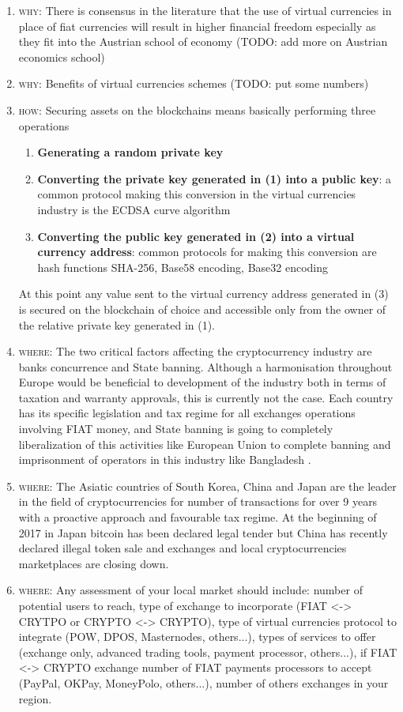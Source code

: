 \documentclass[11pt,fleqn,oneside]{book} %
\begin{document}
\begin{enumerate}
	\item \textsc{why}: There is consensus in the literature that the use of virtual currencies in place of fiat currencies will result in 
	higher financial freedom especially as they fit into the Austrian school of economy \cite{austrianTheory} 
	(TODO: add more on Austrian economics school)

	\item \textsc{why}: Benefits of virtual currencies schemes (TODO: put some numbers)

	\item \textsc{how}: Securing assets on the blockchains means basically performing three operations
		\begin{enumerate}[label*=\arabic*.]
			\item \textbf{Generating a random private key}
			\item \textbf{Converting the private key generated in (1) into a public key}: a common protocol making this conversion
			in the virtual currencies industry is the ECDSA curve algorithm
			\item \textbf{Converting the public key generated in (2) into a virtual currency address}: common protocols for making this conversion
			are hash functions SHA-256, Base58 encoding, Base32 encoding
		\end{enumerate}
	At this point any value sent to the virtual currency address generated in (3) is secured on the blockchain of choice and accessible
	only from the owner of the relative private key generated in (1).
	\item \textsc{where}: The two critical factors affecting the cryptocurrency industry are banks concurrence and State banning.
	Although a harmonisation throughout Europe would be beneficial to development of the industry both in terms of 
	taxation and warranty approvals, this is currently not the case. Each country has its specific legislation and tax
	regime for all exchanges operations involving FIAT money, and State banning is going to completely liberalization 
	of this activities like European Union to complete banning and imprisonment of operators in this industry like Bangladesh
	\cite{bitcoinLegality}. 

	\item \textsc{where}: The Asiatic countries of South Korea, China and Japan are the leader in the field of cryptocurrencies for number of 
	transactions for over 9 years with a proactive approach and favourable tax regime. At the beginning of 2017 in Japan bitcoin
	has been declared legal tender but China has recently declared illegal token sale and exchanges and local cryptocurrencies
	marketplaces are closing down.
	\item \textsc{where}: Any assessment of your local market should include: number of potential users to reach, 
	type of exchange to incorporate (FIAT <-> CRYTPO or CRYPTO <-> CRYPTO), type of virtual currencies protocol 
	to integrate (POW, DPOS, Masternodes, others...), types of services to offer (exchange only, advanced trading tools,
	payment processor, others...), if FIAT <-> CRYPTO exchange number of FIAT payments processors to accept (PayPal, OKPay,
	MoneyPolo, others...), number of others exchanges in your region.


\end{enumerate}
\end{document}
